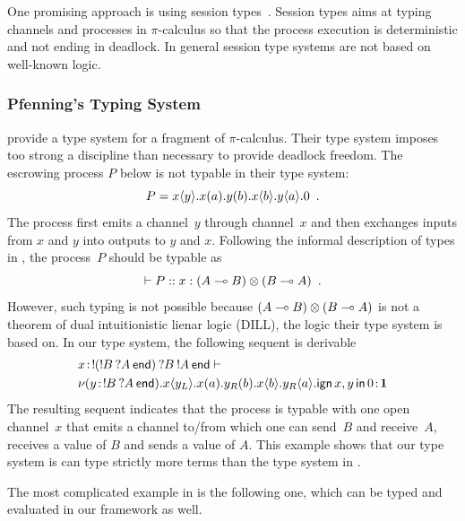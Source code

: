 One promising approach is using session types~\citep{honda-session}.
Session types aims at typing channels and processes in $\pi$-calculus so
that the process execution is deterministic and not ending in deadlock.
In general session type systems are not based on well-known logic.

\subsubsection{Pfenning's Typing System}

\citet{pfenning2010} provide a type system for a fragment of $\pi$-calculus.
Their type system imposes too strong a discipline
than necessary to provide deadlock freedom.
The escrowing process $P$ below is not typable in their type
system:
\[
 P = {x}\langle{y}\rangle.{{{x}({a}).{{{y}({b}).{{x}\langle{b}\rangle.{{y}\langle{a}\rangle.{0}}}}}}}\enspace.
\]
The process first emits a channel~$y$ through channel~$x$ and then
exchanges inputs from $x$ and $y$ into outputs to $y$ and $x$.
Following the informal description of types in \citep{pfenning2010},
the process~$P$ should be typable as
\[
 \vdash P::x:(A\multimap B)\otimes(B\multimap A)\enspace.
\]
However, such typing is not possible because $(A\multimap B)\otimes (B\multimap
A)$ is not a theorem of dual intuitionistic lienar logic (DILL), the
logic their type system
is based on.
In our type system, the following sequent is derivable
\begin{align*}
&
{x} \mathord{\colon\kern -2pt}{\mathop{!}\kern -2pt{(\mathop{!}\kern -2pt{B}\hskip 2pt{\mathop{?}\kern -2pt{A}\hskip 2pt{\mathsf{end}}})}\hskip 2pt{\mathop{?}\kern -2pt{B}\hskip 2pt{\mathop{!}\kern -2pt{A}\hskip 2pt{\mathsf{end}}}}}
\vdash\\
&{
\nu({y} \mathord{\colon\kern -2pt}{\mathop{!}\kern -2pt{B}\hskip 2pt{\mathop{?}\kern -2pt{A}\hskip 2pt{\mathsf{end}}}}).
{{x}\langle{y_L}\rangle.{{{x}({a}).{{{y_R}({b}).{{x}\langle{b}\rangle.{{y_R}\langle{a}\rangle.{\mathsf{ign }\,{x,y}\,\mathsf{ in }\,{0}}}}}}}}}
} \mathord{\colon\kern -2pt}{\mathbf{1}}
\end{align*}
The resulting sequent indicates that the process is typable with one
open channel~$x$ that emits
a channel to/from which one can send~$B$ and receive~$A$, receives a
value of $B$ and
sends a value of $A$.
This example shows that our type system is can type strictly more terms than
the type system in \citet{pfenning2010}.

The most complicated example in \citet{pfenning2010} is the following
one, which can be typed and evaluated in our framework as well.

